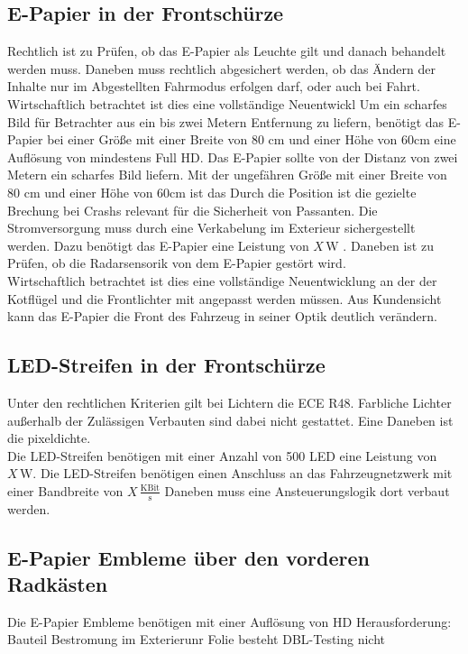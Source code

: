 \subsection{E-Papier in der Frontschürze}
Rechtlich ist zu Prüfen, ob das E-Papier als Leuchte gilt und danach behandelt werden muss. Daneben muss rechtlich abgesichert werden, ob das Ändern der Inhalte nur im Abgestellten Fahrmodus erfolgen darf, oder auch bei Fahrt.\\
Wirtschaftlich betrachtet ist dies eine vollständige Neuentwickl
Um ein scharfes Bild für Betrachter aus ein bis zwei Metern Entfernung zu liefern, benötigt das E-Papier bei einer Größe mit einer Breite von 80 cm und einer Höhe von 60cm eine Auflösung von mindestens Full HD.
Das E-Papier sollte von der Distanz von zwei Metern ein scharfes Bild liefern. Mit der ungefähren Größe mit einer Breite von 80 cm und einer Höhe von 60cm ist das 
Durch die Position ist die gezielte Brechung bei Crashs relevant für die Sicherheit von Passanten.
Die Stromversorgung muss durch eine Verkabelung im Exterieur sichergestellt werden. Dazu benötigt das E-Papier eine Leistung von $ X\,\mathrm{W} $ .
Daneben ist zu Prüfen, ob die Radarsensorik von dem E-Papier gestört wird.\\
Wirtschaftlich betrachtet ist dies eine vollständige Neuentwicklung an der der Kotflügel und die Frontlichter mit angepasst werden müssen. Aus Kundensicht kann das E-Papier die Front des Fahrzeug in seiner Optik deutlich verändern. 
\subsection{LED-Streifen in der Frontschürze}
Unter den rechtlichen Kriterien gilt bei Lichtern die ECE R48. Farbliche Lichter außerhalb der Zulässigen Verbauten sind dabei nicht gestattet. Eine 
Daneben ist die pixeldichte.\\

Die LED-Streifen benötigen mit einer Anzahl von 500 LED eine Leistung von $ X\,\mathrm{W} $. Die LED-Streifen benötigen einen Anschluss an das Fahrzeugnetzwerk mit einer Bandbreite von $ X\,\frac{\mathrm{ KBit}}{\mathrm{s}} $
Daneben muss eine Ansteuerungslogik dort verbaut werden.
\subsection{E-Papier Embleme über den vorderen Radkästen}
Die E-Papier Embleme benötigen mit einer Auflösung von HD 
Herausforderung: Bauteil Bestromung im Exterierunr
Folie besteht DBL-Testing nicht 
